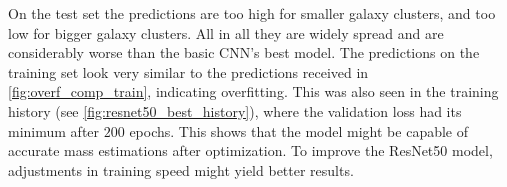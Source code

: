 On the test set the predictions are too high for smaller galaxy clusters, and too low for bigger galaxy clusters. All in all they are widely spread and are considerably worse than the basic CNN's best model.
The predictions on the training set look very similar to the predictions received in \autoref{fig:overf_comp_train}, indicating overfitting. This was also seen in the training history (see \autoref{fig:resnet50_best_history}), where the validation loss had its minimum after $200$ epochs. This shows that the model might be capable of accurate mass estimations after optimization. To improve the ResNet50 model, adjustments in training speed might yield better results.